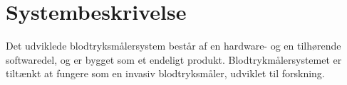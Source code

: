 \chapter{Systembeskrivelse}
Det udviklede blodtryksmålersystem består af en hardware- og en tilhørende softwaredel, og er bygget som et endeligt produkt. Blodtrykmålersystemet er tiltænkt at fungere som en invasiv blodtryksmåler, udviklet til forskning. 